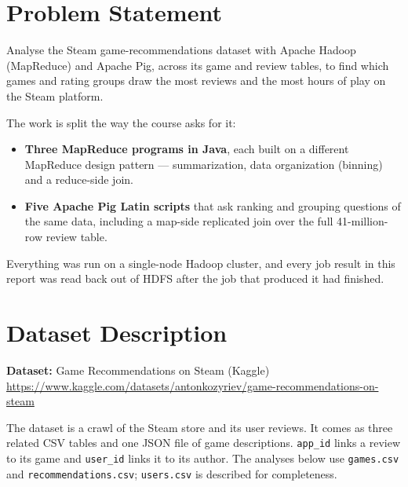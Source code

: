 \documentclass[11pt,a4paper]{article}
\newcommand{\code}[1]{\texttt{#1}}
\begin{document}


\tableofcontents
\newpage

\section{Problem Statement}

Analyse the Steam game-recommendations dataset with Apache Hadoop (MapReduce) and Apache Pig,
across its game and review tables, to find which games and rating groups draw the most reviews and
the most hours of play on the Steam platform.

The work is split the way the course asks for it:

\begin{itemize}
  \item \textbf{Three MapReduce programs in Java}, each built on a different MapReduce design
        pattern — summarization, data organization (binning) and a reduce-side join.
  \item \textbf{Five Apache Pig Latin scripts} that ask ranking and grouping questions of the same
        data, including a map-side replicated join over the full 41-million-row review table.
\end{itemize}

Everything was run on a single-node Hadoop cluster, and every job result in this report was read back
out of HDFS after the job that produced it had finished.

\section{Dataset Description}

\textbf{Dataset:} Game Recommendations on Steam (Kaggle)\\
\url{https://www.kaggle.com/datasets/antonkozyriev/game-recommendations-on-steam}

The dataset is a crawl of the Steam store and its user reviews. It comes as three related CSV
tables and one JSON file of game descriptions. \code{app\_id} links a review to its game and
\code{user\_id} links it to its author. The analyses below use \code{games.csv} and
\code{recommendations.csv}; \code{users.csv} is described for completeness.
\end{document}
